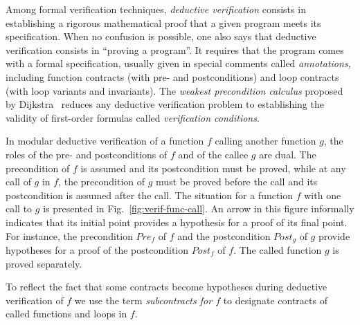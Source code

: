 \documentclass[web]{frama-c-book}
\begin{document}
Among
formal verification techniques, \emph{deductive verification}
consists in establishing a rigorous mathematical proof that a given
program meets its specification. When no confusion is possible, one also says
that deductive verification consists in ``proving a program''. It requires that
the program comes with a formal specification, usually given in special comments 
called \emph{annotations,} including function contracts (with
pre- and postconditions) and loop contracts (with loop variants and invariants).
The \emph{weakest precondition calculus} proposed by
Dijkstra~\cite{DBLP:books/ph/Dijkstra76} reduces any deductive verification
problem to %
establishing the validity of first-order
formulas called \emph{verification conditions}.


In modular deductive verification of a function $f$ calling another function
$g$, the roles of the pre- and postconditions of $f$ and of the callee $g$ are
dual.
The precondition of $f$ is assumed and its  postcondition must be proved, while
at  any call of $g$ in $f$, %
the precondition of
$g$ must be proved before the call and its postcondition is assumed after the
call.
The situation for a function $f$ with one call to $g$ is presented in
Fig.~\ref{fig:verif-func-call}.
An arrow in this figure informally indicates that its initial point provides a
hypothesis for a proof of its final point.
For instance, the precondition $\textit{Pre}_f$ of $f$ and the postcondition
$\textit{Post}_g$ of $g$ provide hypotheses for a proof of the postcondition
$\textit{Post}_f$ of $f$.
The called function $g$ is proved separately.




To reflect the fact that some contracts become hypotheses
during deductive verification of $f$
we use the term \emph{subcontracts for $f$} 
to designate contracts of called functions and loops in $f$.
\end{document}
